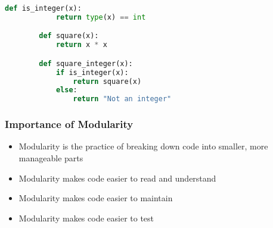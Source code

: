 \documentclass[serif, 9pt, aspectratio=32]{beamer}
\begin{document}
\begin{frame}[fragile]
    \begin{lstlisting}[language=Python]
        def is_integer(x):
            return type(x) == int

        def square(x):
            return x * x

        def square_integer(x):
            if is_integer(x):
                return square(x)
            else:
                return "Not an integer"
    \end{lstlisting}
\end{frame}

\begin{frame}
    \centering
    \frametitle{Importance of Modularity}
    \begin{itemize}
        \setlength{\itemsep}{3em}
        \item Modularity is the practice of breaking down code into smaller, more manageable parts
        \item Modularity makes code easier to read and understand
        \item Modularity makes code easier to maintain
        \item Modularity makes code easier to test
    \end{itemize}
\end{frame}
\end{document}
